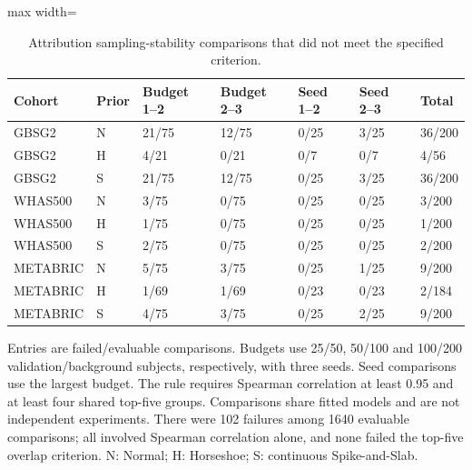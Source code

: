 \begin{table}[htbp]
\centering
\begingroup\singlespacing\footnotesize
\setlength{\tabcolsep}{3pt}
\caption[Attribution sampling-stability comparisons]{Attribution sampling-stability comparisons that did not meet the specified criterion.}\label{tab:exam-attribution-failures}
\begin{adjustbox}{max width=\textwidth}
\begin{tabular}{@{}lllllll@{}}
\toprule Cohort & Prior & Budget 1--2 & Budget 2--3 & Seed 1--2 & Seed 2--3 & Total\\\midrule
GBSG2 & N & 21/75 & 12/75 & 0/25 & 3/25 & 36/200\\
GBSG2 & H & 4/21 & 0/21 & 0/7 & 0/7 & 4/56\\
GBSG2 & S & 21/75 & 12/75 & 0/25 & 3/25 & 36/200\\
WHAS500 & N & 3/75 & 0/75 & 0/25 & 0/25 & 3/200\\
WHAS500 & H & 1/75 & 0/75 & 0/25 & 0/25 & 1/200\\
WHAS500 & S & 2/75 & 0/75 & 0/25 & 0/25 & 2/200\\
METABRIC & N & 5/75 & 3/75 & 0/25 & 1/25 & 9/200\\
METABRIC & H & 1/69 & 1/69 & 0/23 & 0/23 & 2/184\\
METABRIC & S & 4/75 & 3/75 & 0/25 & 2/25 & 9/200\\
\bottomrule
\end{tabular}
\end{adjustbox}
\par\smallskip
\begin{minipage}{\textwidth}
Entries are failed/evaluable comparisons. Budgets use 25/50, 50/100 and 100/200 validation/background subjects, respectively, with three seeds. Seed comparisons use the largest budget. The rule requires Spearman correlation at least 0.95 and at least four shared top-five groups. Comparisons share fitted models and are not independent experiments. There were 102 failures among 1640 evaluable comparisons; all involved Spearman correlation alone, and none failed the top-five overlap criterion. N: Normal; H: Horseshoe; S: continuous Spike-and-Slab.
\end{minipage}
\endgroup
\end{table}
